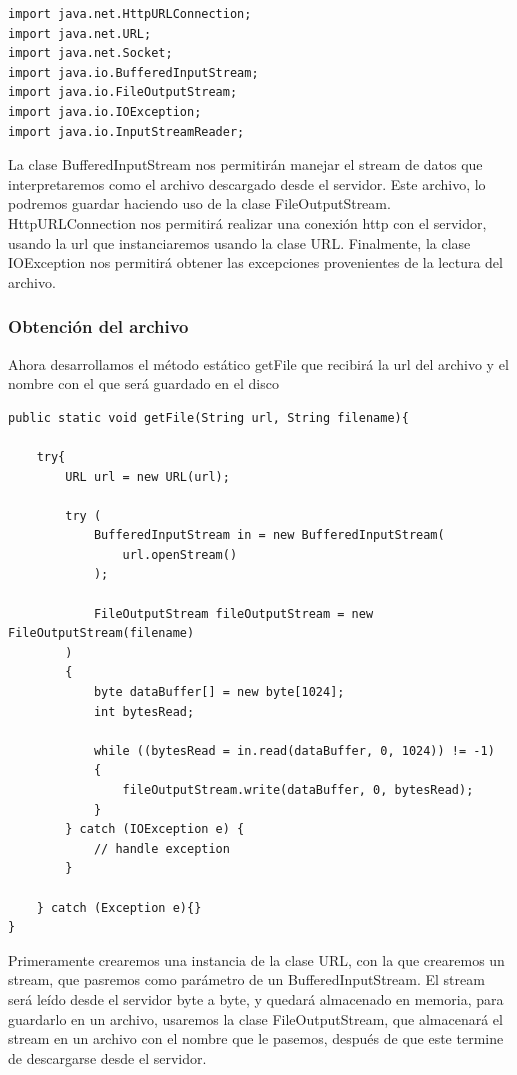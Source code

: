 \documentclass[11pt]{article}
\begin{document}
\begin{verbatim}
import java.net.HttpURLConnection;
import java.net.URL;
import java.net.Socket;
import java.io.BufferedInputStream;
import java.io.FileOutputStream;
import java.io.IOException;
import java.io.InputStreamReader;
\end{verbatim}

La clase BufferedInputStream nos permitirán manejar el stream de datos
que interpretaremos como el archivo descargado desde el servidor.
Este archivo, lo podremos guardar haciendo uso de la clase FileOutputStream.
HttpURLConnection nos permitirá realizar una conexión http con el servidor,
usando la url que instanciaremos usando la clase URL.
Finalmente, la clase IOException nos permitirá obtener las excepciones provenientes de la lectura del archivo.

\subsubsection{Obtención del archivo}
\label{sec:org5df028e}
Ahora desarrollamos el método estático getFile que recibirá la url del archivo y el nombre con el que será guardado en el disco

\begin{verbatim}
public static void getFile(String url, String filename){

    try{
        URL url = new URL(url);

        try (
            BufferedInputStream in = new BufferedInputStream(
                url.openStream()
            );

            FileOutputStream fileOutputStream = new FileOutputStream(filename)
        )
        {
            byte dataBuffer[] = new byte[1024];
            int bytesRead;

            while ((bytesRead = in.read(dataBuffer, 0, 1024)) != -1)
            {
                fileOutputStream.write(dataBuffer, 0, bytesRead);
            }
        } catch (IOException e) {
            // handle exception
        }

    } catch (Exception e){}
}
\end{verbatim}

Primeramente crearemos una instancia de la clase URL,
con la que crearemos un stream, que pasremos como parámetro de un BufferedInputStream.
El stream será leído desde el servidor byte a byte, y quedará almacenado en memoria,
para guardarlo en un archivo, usaremos la clase FileOutputStream,
que almacenará el stream en un archivo con el nombre que le pasemos,
después de que este termine de descargarse desde el servidor.
\end{document}
